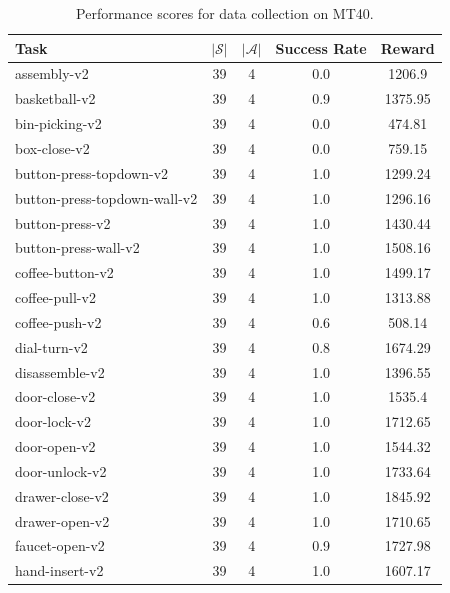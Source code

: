 \begin{table}[]
    \centering
    \caption{Performance scores for data collection on MT40.}
    \begin{tabular}{l c c c c}
    \toprule
                            \textbf{Task} & $|\mathcal{S}|$ & $|\mathcal{A}|$ & \textbf{Success Rate} &      \textbf{Reward} \\
    \midrule
                     assembly-v2 &  39 & 4 &  0.0 &     1206.9  \\
                   basketball-v2 &  39 & 4 &  0.9 &    1375.95  \\
                  bin-picking-v2 &  39 & 4 &  0.0 &     474.81  \\
                    box-close-v2 &  39 & 4 &  0.0 &     759.15  \\
         button-press-topdown-v2 &  39 & 4 &  1.0 &    1299.24  \\
    button-press-topdown-wall-v2 &  39 & 4 &  1.0 &    1296.16  \\
                 button-press-v2 &  39 & 4 &  1.0 &    1430.44  \\
            button-press-wall-v2 &  39 & 4 &  1.0 &    1508.16  \\
                coffee-button-v2 &  39 & 4 &  1.0 &    1499.17  \\
                  coffee-pull-v2 &  39 & 4 &  1.0 &    1313.88  \\
                  coffee-push-v2 &  39 & 4 &  0.6 &     508.14  \\
                    dial-turn-v2 &  39 & 4 &  0.8 &    1674.29  \\
                  disassemble-v2 &  39 & 4 &  1.0 &    1396.55  \\
                   door-close-v2 &  39 & 4 &  1.0 &     1535.4  \\
                    door-lock-v2 &  39 & 4 &  1.0 &    1712.65  \\
                    door-open-v2 &  39 & 4 &  1.0 &    1544.32  \\
                  door-unlock-v2 &  39 & 4 &  1.0 &    1733.64  \\
                 drawer-close-v2 &  39 & 4 &  1.0 &    1845.92  \\
                  drawer-open-v2 &  39 & 4 &  1.0 &    1710.65  \\
                  faucet-open-v2 &  39 & 4 &  0.9 &    1727.98  \\
                  hand-insert-v2 &  39 & 4 &  1.0 &    1607.17  \\

\end{tabular}
\end{table}
